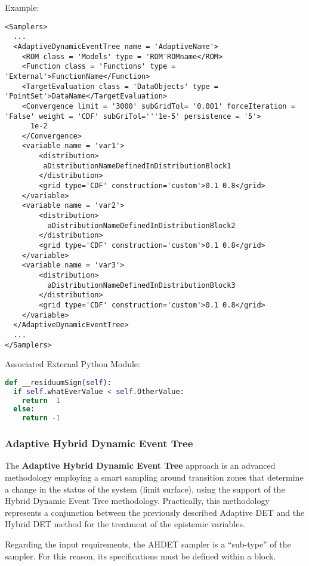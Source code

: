 Example:
\begin{lstlisting}[style=XML]
<Samplers>
  ...
  <AdaptiveDynamicEventTree name = 'AdaptiveName'>
    <ROM class = 'Models' type = 'ROM'ROMname</ROM>
    <Function class = 'Functions' type = 'External'>FunctionName</Function>
    <TargetEvaluation class = 'DataObjects' type = 'PointSet'>DataName</TargetEvaluation>
    <Convergence limit = '3000' subGridTol= '0.001' forceIteration = 'False' weight = 'CDF' subGriTol='''1e-5' persistence = '5'>
      1e-2
    </Convergence>
    <variable name = 'var1'>
        <distribution>
         aDistributionNameDefinedInDistributionBlock1
        </distribution>
        <grid type='CDF' construction='custom'>0.1 0.8</grid>
    </variable>
    <variable name = 'var2'>
        <distribution>
          aDistributionNameDefinedInDistributionBlock2
        </distribution>
        <grid type='CDF' construction='custom'>0.1 0.8</grid>
    </variable>
    <variable name = 'var3'>
        <distribution>
          aDistributionNameDefinedInDistributionBlock3
        </distribution>
        <grid type='CDF' construction='custom'>0.1 0.8</grid>
    </variable>
  </AdaptiveDynamicEventTree>
  ...
</Samplers>
\end{lstlisting}

Associated External Python Module:
\begin{lstlisting}[language=python]
def __residuumSign(self):
  if self.whatEverValue < self.OtherValue:
    return  1
  else:
    return -1
\end{lstlisting}


\subsubsection{Adaptive Hybrid Dynamic Event Tree}
\label{subsubsubsec:AHDET}
The \textbf{Adaptive Hybrid Dynamic Event Tree} approach is an advanced methodology
employing a smart sampling around transition zones that determine a change in
the status of the system (limit surface), using the support of the Hybrid Dynamic Event
Tree methodology. Practically, this methodology represents a conjunction between the previously
described Adaptive DET and the Hybrid DET method for the treatment of the epistemic variables.

Regarding the input requirements, the AHDET sampler is a ``sub-type'' of the\\
 sampler.
%
For this reason, its specifications must be defined within a
 block.

